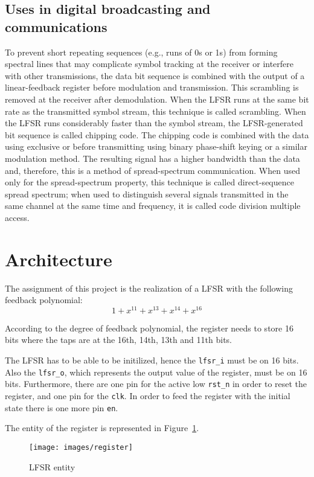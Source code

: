 \documentclass[11pt,a4paper,oneside, openright]{article}
\begin{document}
\subsection{Uses in digital broadcasting and communications}
To prevent short repeating sequences (e.g., runs of 0s or 1s) from forming spectral lines that may complicate symbol tracking at the receiver or interfere with other transmissions, the data bit sequence is combined with the output of a linear-feedback register before modulation and transmission. This scrambling is removed at the receiver after demodulation. When the LFSR runs at the same bit rate as the transmitted symbol stream, this technique is called scrambling. When the LFSR runs considerably faster than the symbol stream, the LFSR-generated bit sequence is called chipping code. The chipping code is combined with the data using exclusive or before transmitting using binary phase-shift keying or a similar modulation method. The resulting signal has a higher bandwidth than the data and, therefore, this is a method of spread-spectrum communication. When used only for the spread-spectrum property, this technique is called direct-sequence spread spectrum; when used to distinguish several signals transmitted in the same channel at the same time and frequency, it is called code division multiple access.

\section{Architecture}

The assignment of this project is the realization of a LFSR with the following feedback polynomial:
$$ 1 + x^{11} + x^{13} + x^{14} + x^{16} $$

According to the degree of feedback polynomial, the register needs to store 16 bits where the taps are at the 16th, 14th, 13th and 11th bits.

The LFSR has to be able to be initilized, hence the \texttt{lfsr\_i} must be on 16 bits. Also the \texttt{lfsr\_o}, which represents the output value of the register, must be on 16 bits. Furthermore, there are one pin for the active low \texttt{rst\_n} in order to reset the register, and one pin for the \texttt{clk}. In order to feed the register with the initial state there is one more pin \texttt{en}.

The entity of the register is represented in Figure~\ref{fig:register}.

\begin{figure}[h]
    \centering
    \texttt{[image: images/register]}
    \caption{LFSR entity}
    \label{fig:register}
\end{figure}
\end{document}

